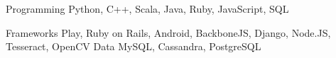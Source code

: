 

\begin{cvskills}

  \cvskill
    {Programming} %
    {Python, C++, Scala, Java, Ruby, JavaScript, SQL} %


  \cvskill
  {Frameworks} %
    {Play, Ruby on Rails, Android, BackboneJS, Django, Node.JS, Tesseract, OpenCV } %
  \cvskill
  {Data} %
    {MySQL, Cassandra, PostgreSQL} %
\end{cvskills}
